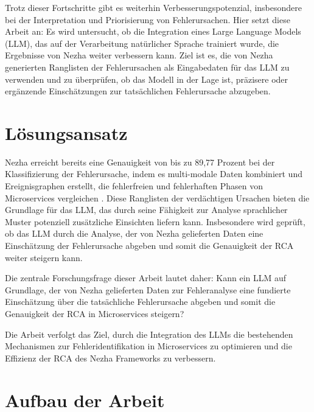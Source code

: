 Trotz dieser Fortschritte gibt es weiterhin Verbesserungspotenzial, insbesondere bei der Interpretation und Priorisierung von Fehlerursachen. Hier setzt diese Arbeit an: Es wird untersucht, ob die Integration eines Large Language Models (LLM), das auf der Verarbeitung natürlicher Sprache trainiert wurde, die Ergebnisse von Nezha weiter verbessern kann. Ziel ist es, die von Nezha generierten Ranglisten der Fehlerursachen als Eingabedaten für das LLM zu verwenden und zu überprüfen, ob das Modell in der Lage ist, präzisere oder ergänzende Einschätzungen zur tatsächlichen Fehlerursache abzugeben.

\section{Lösungsansatz}
\label{sec:loesungsansatz}

Nezha erreicht bereits eine Genauigkeit von bis zu 89,77 Prozent bei der Klassifizierung der Fehlerursache, indem es multi-modale Daten kombiniert und Ereignisgraphen erstellt, die fehlerfreien und fehlerhaften Phasen von Microservices vergleichen . Diese Ranglisten der verdächtigen Ursachen bieten die Grundlage für das LLM, das durch seine Fähigkeit zur Analyse sprachlicher Muster potenziell zusätzliche Einsichten liefern kann. Insbesondere wird geprüft, ob das LLM durch die Analyse, der von Nezha gelieferten Daten eine Einschätzung der Fehlerursache abgeben und somit die Genauigkeit der RCA weiter steigern kann.

Die zentrale Forschungsfrage dieser Arbeit lautet daher: Kann ein LLM auf Grundlage, der von Nezha gelieferten Daten zur Fehleranalyse eine fundierte Einschätzung über die tatsächliche Fehlerursache abgeben und somit die Genauigkeit der RCA in Microservices steigern?

Die Arbeit verfolgt das Ziel, durch die Integration des LLMs die bestehenden Mechanismen zur Fehleridentifikation in Microservices zu optimieren und die Effizienz der RCA des Nezha Frameworks zu verbessern.


\section{Aufbau der Arbeit}




 